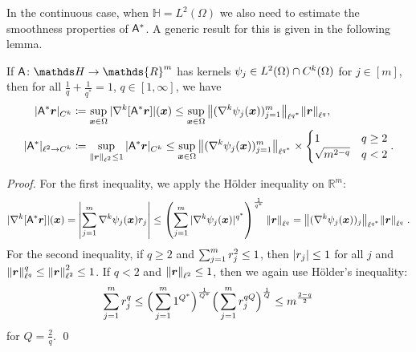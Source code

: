 \documentclass[smallextended]{svjour3}
\let\F\mathds\let\C\mathcal\newcommand{\R}{\F{R}}\newcommand{\A}{\tens{A}}
\newcommand{\norm}[1]{{\left\lVert #1 \right\rVert}}
\newcommand{\splitln}[4]{\begin{cases} #1 & #2 \\ #3 & #4\end{cases}}
\newcommand{\1}{\F{1}}
\newcommand*{\vard}[1]{%
	\IfEqCase{#1}{%
		{0}{\varphi}%
		{1}{\psi}%
	}[\varphi #1]%
}
\newcommand*{\varx}[1]{%
	\IfEqCase{#1}{%
		{0}{x}%
		{1}{y}%
		{2}{z}%
		{3}{r}%
	}[x#1]%
}
\newcommand{\Domain}{\Omega}\newcommand{\domain}{\omega}
\newcommand*{\vvarx}[1]{\vec{\varx{#1}}}
\begin{document}
	
	In the continuous case, when $\F H=L^2(\Domain)$ we also need to estimate the smoothness properties of $\A^*$. A generic result for this is given in the following lemma.
	\begin{lemma}\label{thm: norm bound smoothness}
		If $\A\colon \F H \to \R^m$ has kernels $\vard1_j\in L^2(\Domain)\cap C^k(\Domain)$ for $j\in[m]$, then for all $\frac1q+\frac1{q^*}=1$, $q\in[1,\infty]$, we have
		\begin{align}
			|\A^*\vvarx3|_{C^k}&\coloneqq \sup_{\vvarx0\in\Domain} |\nabla^k[\A^*\vvarx3]|(\vvarx0) \leq \sup_{\vvarx0\in\Domain}\norm{(\nabla^k\vard1_j(\vvarx0))_{j=1}^m}_{\ell^{q^*}}\norm{\vvarx3}_{\ell^q},
			\\ |\A^*|_{\ell^2\to C^k}&\coloneqq \sup_{\norm{\vvarx3}_{\ell^2}\leq 1} |\A^*\vvarx3|_{C^k} \leq \sup_{\vvarx0\in\Domain}\norm{(\nabla^k\vard1_j(\vvarx0))_{j=1}^m}_{\ell^{q^*}}\times \splitln{1}{q\geq 2}{\sqrt{m^{2-q}}}{q<2}.
		\end{align}
	\end{lemma}
	\begin{proof}
		For the first inequality, we apply the H\"older inequality on $\R^m$:
		$$ |\nabla^k[\A^*\vvarx3]|(\vvarx0) = \left|\sum_{j=1}^m\nabla^k\vard1_j(\vvarx0)\varx3_j\right|
		\leq \left(\sum_{j=1}^m|\nabla^k\vard1_j(\vvarx0)|^{q^*}\right)^{\frac{1}{q^*}}\norm{\vvarx3}_{\ell^q} = \norm{(\nabla^k\vard1_j(\vvarx0))_j}_{\ell^{q^*}}\norm{\vvarx3}_{\ell^q}\;.$$
		For the second inequality, if $q\geq2$ and $\sum_{j=1}^m \varx3_j^2\leq 1$, then $|\varx3_j|\leq 1$ for all $j$ and $\norm{\vvarx3}_{\ell^q}^q\leq \norm{\vvarx3}_{\ell^2}^2\leq 1$. If $q<2$ and $\norm{\vvarx3}_{\ell^2}\leq 1$, then we again use H\"older's inequality:
		$$\sum_{j=1}^m \varx3_j^q \leq \Big(\sum_{j=1}^m 1^{Q^*}\Big)^{\frac1{Q^*}} \Big(\sum_{j=1}^m \varx3_j^{qQ}\Big)^{\frac1{Q}} \leq m^{\frac{2-q}{2}}$$
		for $Q = \frac2q$.
		\qed\end{proof}
	
\end{document}
